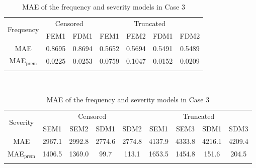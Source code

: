 \begin{table}[!h]
\renewcommand{\tabcolsep}{0.8mm}
\renewcommand{\arraystretch}{1}
\footnotesize
\centering
{\color{blue}
\begin{tabular}[h]{ccccccc}
\toprule
\multirow{2}{*}{Frequency} & \multicolumn{2}{c}{Censored} & \multicolumn{4}{c}{Truncated}\\
\cmidrule(l{3pt}r{3pt}){2-3} \cmidrule(l{3pt}r{3pt}){4-7}
 & FEM1 & FDM1 & FEM1 & FEM2 & FDM1 & FDM2\\
\midrule
MAE & 0.8695 & 0.8694 & 0.5652 & 0.5694 & 0.5491 & 0.5489 \\
MAE$_{\text{prem}}$ & 0.0225 & 0.0253 & 0.0759 & 0.1047 & 0.0152 & 0.0209 \\
\hhline{=======}
\end{tabular}
\\
\vspace{0.3cm}
\begin{tabular}[h]{ccccccccc}
\toprule
\multirow{2}{*}{Severity} & \multicolumn{4}{c}{Censored} & \multicolumn{4}{c}{Truncated}\\
\cmidrule(l{3pt}r{3pt}){2-5} \cmidrule(l{3pt}r{3pt}){6-9}
 & SEM1 & SEM2 & SDM1 & SDM2 & SEM1 & SEM3 & SDM1 & SDM3\\
\midrule
MAE & 2967.1 & 2992.8 & 2774.6 & 2774.8 & 4137.9 & 4333.8 & 4216.1 & 4209.4 \\
MAE$_{\text{prem}}$ & 1406.5 & 1369.0 & 99.7 & 113.1 & 1653.5 & 1454.8 & 151.6 & 204.5 \\
\hhline{=========}
\end{tabular}
}
\caption{MAE of the frequency and severity models in Case 3}\label{tab:maecase3}
\end{table}
